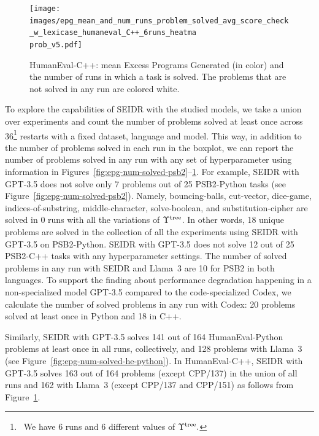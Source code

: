 \begin{figure}
  \centering
  \texttt{[image: images/epg\_mean\_and\_num\_runs\_problem\_solved\_avg\_score\_check\_w\_lexicase\_humaneval\_C++\_6runs\_heatma\\prob\_v5.pdf]}  %
  \vspace{-4pt}
  \caption{HumanEval-C++: mean Excess Programs Generated (in color) and the number of runs in which a task is solved. The problems that are not solved in any run are colored white.}
  \label{fig:epg-num-solved-he-c++}
  \vspace{-12pt}
\end{figure}



To explore the capabilities of SEIDR with the studied models, we take a union over experiments and count the number of problems solved at least once across 36\footnote{~We have 6 runs and 6 different values of $\Upsilon^\text{tree}.$} restarts with a fixed dataset, language and model.
This way, in addition to the number of problems solved in each run in the boxplot, we can report the number of problems solved in any run with any set of hyperparameter using information in Figures~\ref{fig:epg-num-solved-psb2}--\ref{fig:epg-num-solved-he-c++}.
For example, SEIDR with GPT-3.5 does not solve only 7 problems out of 25 PSB2-Python tasks (see Figure~\ref{fig:epg-num-solved-psb2}).
Namely, bouncing-balls, cut-vector, dice-game, indices-of-substring, middle-character, solve-boolean, and substitution-cipher are solved in 0 runs with all the variations of $\Upsilon^\text{tree}$.
In other words, 18 unique problems are solved in the collection of all the experiments using SEIDR with GPT-3.5 on PSB2-Python. 
SEIDR with GPT-3.5 does not solve 12 out of 25 PSB2-C++ tasks with any hyperparameter settings. 
The number of solved problems in any run with SEIDR and Llama~3 are 10 for PSB2 in both languages. 
To support the finding about performance degradation happening in a non-specialized model GPT-3.5 compared to the code-specialized Codex, we calculate the number of solved problems in any run with Codex: 20 problems solved at least once in Python and 18 in C++. 

Similarly, SEIDR with GPT-3.5 solves 141 out of 164 HumanEval-Python problems at least once in all runs, collectively, and 128 problems with Llama~3 (see Figure~\ref{fig:epg-num-solved-he-python}).
In HumanEval-C++, SEIDR with GPT-3.5 solves 163 out of 164 problems (except CPP/137) in the union of all runs and 162 with Llama~3 (except CPP/137 and CPP/151) as follows from Figure~\ref{fig:epg-num-solved-he-c++}.


